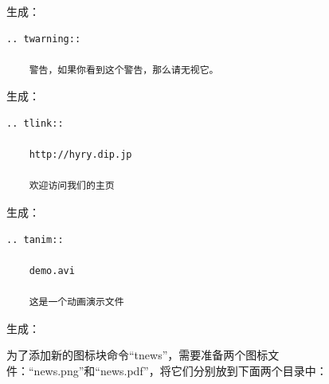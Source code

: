 \documentclass[letterpaper,10pt]{sphinxmanual}
\begin{document}
生成：

\begin{Verbatim}[commandchars=\\\{\}]
.. twarning::

    警告，如果你看到这个警告，那么请无视它。
\end{Verbatim}

生成：

\begin{Verbatim}[commandchars=\\\{\}]
.. tlink::

    http://hyry.dip.jp

    欢迎访问我们的主页
\end{Verbatim}

生成：

\begin{Verbatim}[commandchars=\\\{\}]
.. tanim::

    demo.avi

    这是一个动画演示文件
\end{Verbatim}

生成：

为了添加新的图标块命令“tnews”，需要准备两个图标文件：“news.png”和“news.pdf”，将它们分别放到下面两个目录中：
\end{document}

